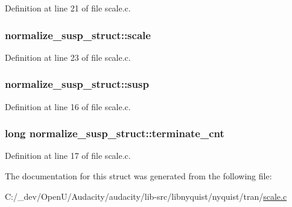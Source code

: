 Definition at line 21 of file scale.\+c.

\subsubsection[{\texorpdfstring{scale}{scale}}]{ normalize\+\_\+susp\+\_\+struct\+::scale}\hypertarget{structnormalize__susp__struct_ad3ea5692b717ce392c20f5080ee12801}{}\label{structnormalize__susp__struct_ad3ea5692b717ce392c20f5080ee12801}


Definition at line 23 of file scale.\+c.

\subsubsection[{\texorpdfstring{susp}{susp}}]{ normalize\+\_\+susp\+\_\+struct\+::susp}\hypertarget{structnormalize__susp__struct_a0ddeda48adaf69ca12a1450052dbcb81}{}\label{structnormalize__susp__struct_a0ddeda48adaf69ca12a1450052dbcb81}


Definition at line 16 of file scale.\+c.

\subsubsection[{\texorpdfstring{terminate\+\_\+cnt}{terminate_cnt}}]{\setlength{\rightskip}{0pt plus 5cm}long normalize\+\_\+susp\+\_\+struct\+::terminate\+\_\+cnt}\hypertarget{structnormalize__susp__struct_a0b9132183c5c8b80d6b092b3156f45b9}{}\label{structnormalize__susp__struct_a0b9132183c5c8b80d6b092b3156f45b9}


Definition at line 17 of file scale.\+c.



The documentation for this struct was generated from the following file\+:\begin{DoxyCompactItemize}
\item 
C\+:/\+\_\+dev/\+Open\+U/\+Audacity/audacity/lib-\/src/libnyquist/nyquist/tran/\hyperlink{scale_8c}{scale.\+c}\end{DoxyCompactItemize}
